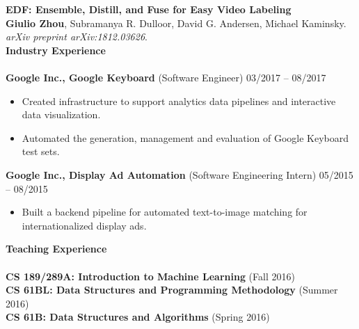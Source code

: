 \documentclass{article}
\begin{document}
\noindent
\textbf{EDF: Ensemble, Distill, and Fuse for Easy Video Labeling} \\
\textbf{Giulio Zhou}, Subramanya R. Dulloor, David G. Andersen, Michael Kaminsky. \textit{arXiv preprint arXiv:1812.03626}. \\

\noindent
\textbf{{\Large Industry Experience}}\\[-2mm]
\HRule\\
\textbf{Google Inc., Google Keyboard} (Software Engineer)
\hfill 03/2017 -- 08/2017\\
\begin{itemize}
\vspace{-6.5mm}
\item Created infrastructure to support analytics data pipelines and interactive data visualization.
\vspace{-2.5mm}
\item Automated the generation, management and evaluation of Google Keyboard test sets.
\end{itemize}
\vspace{-2mm}

\noindent
\textbf{Google Inc., Display Ad Automation} (Software Engineering Intern)
\hfill 05/2015 -- 08/2015\\
\begin{itemize}
\vspace{-6.5mm}
\item Built a backend pipeline for automated text-to-image matching for internationalized display ads.
\end{itemize}
\vspace{1mm}

\noindent
\textbf{{\Large Teaching Experience}}\\[-2mm]
\HRule\\
\hspace*{1.2mm}\textbf{CS 189/289A: Introduction to Machine Learning} (Fall 2016) \\
\vspace{0.5mm}
\textbf{CS 61BL: Data Structures and Programming Methodology} (Summer 2016) \\
\vspace{0.5mm}
\textbf{CS 61B: Data Structures and Algorithms} (Spring 2016)
\vspace{2.0mm}
\end{document}
